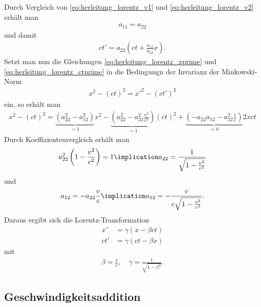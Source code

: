 Durch Vergleich von \eqref{eq:herleitung_lorentz_v1} und \eqref{eq:herleitung_lorentz_v2} erhält man
\begin{align*}
    a_{11}=a_{22}
\end{align*}
und damit
\begin{align}
    \label{eq:herleitung_lorentz_ctprime}
    ct'=a_{22}\left(ct+\frac{a_{12}}{a_{22}}x\right).
\end{align}
Setzt man nun die Gleichungen \eqref{eq:herleitung_lorentz_xprime} und \eqref{eq:herleitung_lorentz_ctprime} in die Bedingungn der Invarianz der Minkowski-Norm
\begin{align*}
    x^2-(ct)^2 = {x'}^2-(ct')^2
\end{align*}
ein, so erhält man
\begin{align*}
    x^2-(ct)^2 = \underbrace{\left(a_{22}^2-a_{12}^2\right)}_{=1}x^2 - \underbrace{\left(a_{22}^2-a_{22}^2 \frac{v^2}{c^2}\right)}_{=1}(ct)^2 + \underbrace{\left(-a_{22}a_{12}-a_{22}^2 \frac{v}{c}\right)}_{=0}2xct
\end{align*}
Durch Koeffizientenvergleich erhält man
\begin{align*}
    a_{22}^2 \left(1-\frac{v^2}{c^2}\right) = 1 \implication a_{22} = \frac{1}{\sqrt{1-\frac{v^2}{c^2}}}
\end{align*}
und
\begin{align*}
    a_{12} = -a_{22} \frac{v}{c} \implication a_{12} = -\frac{v}{c \sqrt{1-\frac{v^2}{c^2}}}.
\end{align*}
Daraus ergibt sich die Lorentz-Transformation
\begin{align*}
    x'  & = \gamma(x-\beta ct)  \\
    ct' & = \gamma(ct- \beta x)
\end{align*}
mit
\begin{align*}
    \beta=\frac{v}{c}, \quad \gamma=\frac{1}{\sqrt{1-\beta^2}}.
\end{align*}

\subsection{Geschwindigkeitsaddition}

